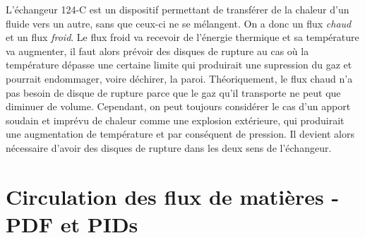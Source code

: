 \documentclass[a4paper,oneside,12pt]{article}
\begin{document}
L'échangeur 124-C est un dispositif permettant de transférer de la chaleur d'un fluide
vers un autre, sans que ceux-ci ne se mélangent.
On a donc un flux \emph{chaud} et un flux \emph{froid}. Le flux froid va recevoir de 
l'énergie thermique et sa température va augmenter, il faut alors prévoir des disques 
de rupture au cas où la température dépasse une certaine limite qui produirait une 
supression du gaz et pourrait endommager, voire déchirer, la paroi.
Théoriquement, le flux chaud n'a pas besoin de disque de rupture parce que le gaz qu'il 
transporte ne peut que diminuer de volume. Cependant, on peut toujours considérer le cas
d'un apport soudain et imprévu de chaleur comme une explosion extérieure, qui produirait
une augmentation de température et par conséquent de pression. 
Il devient alors nécessaire d'avoir des disques de rupture dans les deux sens de l'échangeur.


\appendix
\section{Circulation des flux de matières - PDF et PIDs}
\label{ann:fluxes}
\end{document}
